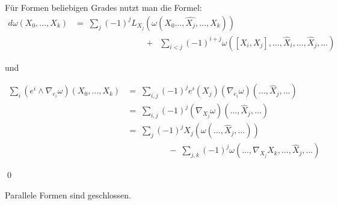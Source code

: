 \documentclass[%
	paper=a5,%
	fleqn,%
	DIV=18,%
	BCOR=0mm,
	fontsize=11pt,
	titlepage=false,%
	bibliography=totoc,
	DIV=18,%
	twoside=true,
	pdftitle=Riemannsche Geometrie,
	pdfauthor=Uwe Semmelmann,
	numbers=noendperiod]%
	{scrbook}
\begin{document}
\medskip

F\"ur Formen beliebigen Grades nutzt man die Formel:
$$
\begin{array}{rl}
d\omega (X_0, \ldots, X_k)
& =\;
\sum_j (-1)^j L_{X_j}(\omega(X_0 \ldots, \hat{X_j},\ldots, X_k) )\\[1.5ex]
& \phantom{xxxxxxxxxxxxxx}\;+\;\;
\sum_{i<j}(-1)^{i+j} \omega([X_i, X_j],\ldots, \hat X_i, \ldots, \hat X_j, \ldots)
\end{array}
$$

und 

$$
\begin{array}{rl}
\sum_i (e^i \wedge \nabla_{e_i} \omega)(X_0, \ldots, X_k)
& = \;
\sum_{i, j} (-1)^j e^i(X_j)(\nabla_{e_i}\omega)(\ldots, \hat X_j, \ldots) \\[1.5ex]
& = \;
\sum_{i, j}(-1)^j (\nabla_{X_j}\omega)(\ldots, \hat X_j, \ldots)\\[1.5ex]
& = \;
\sum_{j} (-1)^j X_j(\omega(\ldots, \hat X_j, \ldots)) \\[1ex] 
& \phantom{xxxxxxxx} \;-\; \sum_{j,k} (-1)^j \omega(\ldots, \nabla_{X_j}X_k, \ldots, \hat X_j, \ldots)
\end{array}
$$


\qed

\bigskip

\begin{Folgerung}
 Parallele Formen sind geschlossen.
\end{Folgerung}


\bigskip
\end{document}
